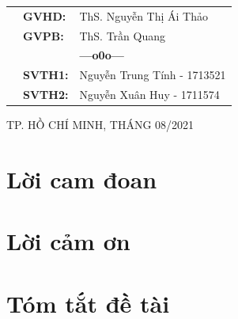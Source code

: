 \documentclass[a4paper,12pt,fleqn,print,oneside]{extarticle}
\begin{document}
\begin{titlepage}
\begin{table}[h]
\renewcommand{\arraystretch}{1.5}
\begin{tabular}{lll}
\hspace{5 cm}
& \textbf{{\large GVHD:}} & {\large ThS. Nguyễn Thị Ái Thảo} \\
& \textbf{{\large GVPB:}} & {\large ThS. Trần Quang}\\
&  & \textbf{---o0o---} \\
& \textbf{{\large SVTH1:}} & {\large Nguyễn Trung Tính - 1713521} \\
& \textbf{{\large SVTH2:}} & {\large Nguyễn Xuân Huy - 1711574} \\
\end{tabular}
\end{table}

\vspace{0.5cm}

\begin{center}
{\footnotesize {\large TP. HỒ CHÍ MINH, THÁNG 08/2021}}
\end{center}
\end{titlepage}

\thispagestyle{empty}


\newpage
{}
\section*{Lời cam đoan}



\newpage
{}
\section*{Lời cảm ơn}



\newpage
{}
\section*{Tóm tắt đề tài}





\newpage
\tableofcontents
\end{document}
